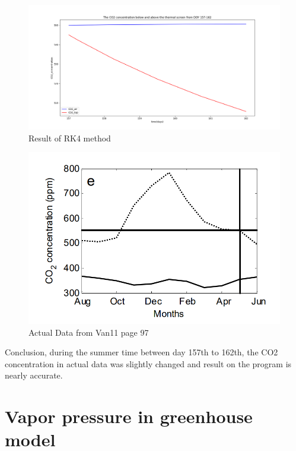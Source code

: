 \documentclass[a4paper]{article}
\numberwithin{equation}{section}
\begin{document}
\begin{figure}[H]
  \centering
  \includegraphics[width=16cm]{CO2_compare_RK4.png}
  \caption{Result of RK4 method}
\end{figure}

\begin{figure}[H]
  \centering
  \includegraphics[width=12cm]{ActualData.png}
  \caption{Actual Data from Van11 page 97}
\end{figure}

Conclusion, during the summer time between day 157th to 162th, the CO2 concentration in actual data was slightly changed and result on the program is nearly accurate.

\section{Vapor pressure in greenhouse model}
\end{document}
